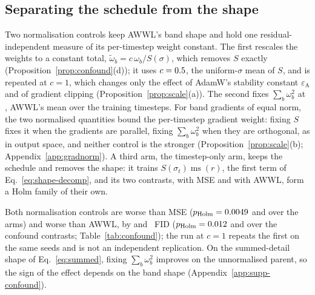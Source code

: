 
\subsection{Separating the schedule from the shape}
\label{sec:confound-controls}
\label{sec:confound-results}

Two normalisation controls keep AWWL's band shape and hold one
residual-independent measure of its per-timestep weight constant. The first
rescales the weights to a constant total,
$\tilde\omega_b = c\,\omega_b / S(\sigma)$, which removes $S$ exactly
(Proposition~\ref{prop:confound}(d)); it uses $c = 0.5$, the
uniform-$\sigma$ mean of $S$, and is repeated at $c = 1$, which changes only
the effect of AdamW's stability constant $\varepsilon_{\mathrm{A}}$ and of
gradient clipping (Proposition~\ref{prop:scale}(a)). The second fixes $\sum_b \omega_b^2$ at
\levelSqFixed, AWWL's mean over the training timesteps. For band gradients of
equal norm, the two normalised quantities bound the per-timestep gradient
weight: fixing $S$ fixes it when the gradients are parallel, fixing
$\sum_b \omega_b^2$ when they are orthogonal, as in output space, and neither
control is the stronger (Proposition~\ref{prop:scale}(b);
Appendix~\ref{app:gradnorm}). A third arm, the timestep-only arm, keeps the
schedule and removes the shape: it trains $S(\sigma_t)\operatorname{ms}(r)$,
the first term of Eq.~\eqref{eq:shape-decomp}, and its two contrasts, with
MSE and with AWWL, form a Holm family of their own.



Both normalisation controls are worse than MSE
($p_{\mathrm{Holm}} = 0.0049$ and \dSqFixedHolm{} over the
\nFamilyMain{} arms) and worse than AWWL, by \dSumFixedVsAWWL{} and
\dSqFixedVsAWWL~FID ($p_{\mathrm{Holm}} = 0.012$ and
\dSqFixedVsAWWLHolm{} over the \nFamilyConfound{} confound contrasts;
Table~\ref{tab:confound}); the run at $c = 1$ repeats the first on the same
seeds and is not an independent replication. On the summed-detail shape of
Eq.~\eqref{eq:summed}, fixing $\sum_b \omega_b^2$ improves on the
unnormalised parent, so the sign of the effect depends on the band shape
(Appendix~\ref{app:supp-confound}).

